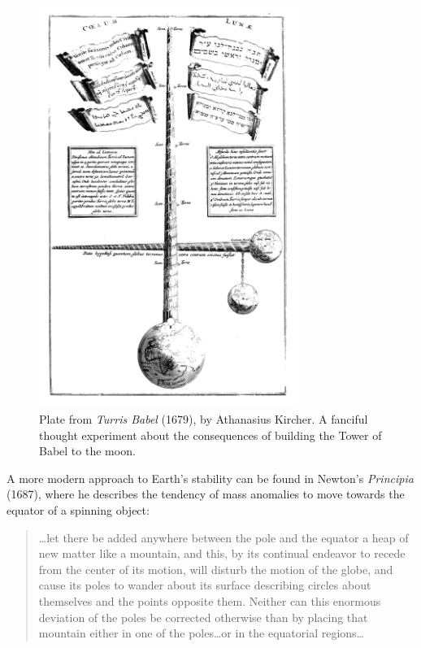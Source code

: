 \begin{figure}
\centering
\includegraphics[width=0.75\textwidth]{intro/figures/turris_babel.jpg}
\caption[Plate from \emph{Turris Babel} (1679), by Athanasius Kircher.]{Plate from \emph{Turris Babel} (1679), by Athanasius Kircher.
A fanciful thought experiment about the consequences of building the Tower of Babel to the moon.}
\label{fig:turris_babel}
\end{figure}

A more modern approach to Earth's stability can be found in Newton's \emph{Principia} (1687),
where he describes the tendency of mass anomalies to move towards the equator of a spinning object:
\begin{quote}
\ldots let there be added anywhere between the pole and the equator a heap of new matter like a mountain,
and this, by its continual endeavor to recede from the center of its motion, will disturb the motion of the globe, 
and cause its poles to wander about its surface describing circles about themselves and the points opposite them.
Neither can this enormous deviation of the poles be corrected otherwise than by placing that mountain either in
one of the poles\ldots or in the equatorial regions\ldots
\end{quote}

